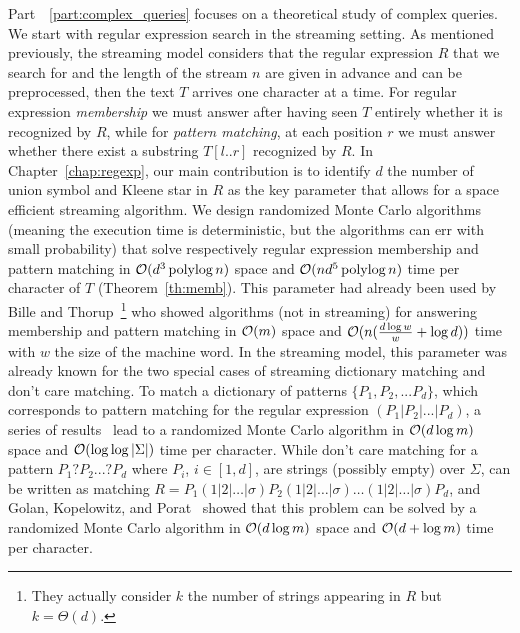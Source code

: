 Part~ \ref{part:complex_queries} focuses on a theoretical study of complex queries. 
%
We start with regular expression search in the streaming setting.
%
As mentioned previously, the streaming model considers that the regular expression $R$ that we search for and the length of the stream $n$ are given in advance and can be preprocessed, then the text $T$ arrives one character at a time. For regular expression \emph{membership} we must answer after having seen $T$ entirely whether it is recognized by $R$, while for \emph{pattern matching}, at each position $r$ we must answer whether there exist a substring $T[l..r]$ recognized by $R$.
In Chapter~\ref{chap:regexp}, our main contribution is to identify $d$ the number of union symbol and Kleene star in $R$ as the key parameter that allows for a space efficient streaming algorithm. We design randomized Monte Carlo algorithms (meaning the execution time is deterministic, but the algorithms can err with small probability) that solve respectively regular expression membership and pattern matching in $\mathcal{O}(d^3\operatorname{polylog} n)$ space and $\mathcal{O}(nd^5\operatorname{polylog} n)$ time per character of $T$ (Theorem~\ref{th:memb}).
This parameter had already been used by Bille and Thorup~\cite{doi:10.1137/1.9781611973075.104}\footnote{They actually consider $k$ the number of strings appearing in $R$ but $k=\Theta(d)$.} who showed algorithms (not in streaming) for answering membership and pattern matching in $\mathcal{O}(m)$ space and $\mathcal{O}(n(\frac{d\log w}{w} + \log d))$ time with $w$ the size of the machine word.
In the streaming model, this parameter was already known for the two special cases of streaming dictionary matching and don't care matching. To match a dictionary of patterns $\{P_1, P_2, ... P_d \}$, which corresponds to pattern matching for the regular expression $(P_1| P_2| ... | P_d)$, a series of results~\cite{Porat:09,DBLP:journals/talg/BreslauerG14,DBLP:conf/esa/CliffordFPSS15,DBLP:conf/esa/GolanP17,DBLP:conf/icalp/GolanKP18} lead to a randomized Monte Carlo algorithm in $\mathcal{O}(d\log m)$ space and $\mathcal{O}(\log \log |\Sigma|)$ time per character.
While don't care matching for a pattern $P_1 ? P_2 ... ? P_d$ where $P_i$, $i \in [1,d]$, are strings (possibly empty) over $\Sigma$, can be written as matching $R = P_1 (1|2|\ldots|\sigma) P_2 (1|2|\ldots|\sigma) \ldots (1|2|\ldots|\sigma) P_{d}$, and Golan, Kopelowitz, and Porat~\cite{DBLP:journals/algorithmica/GolanKP19} showed that this problem can be solved by a randomized Monte Carlo algorithm in $\mathcal{O}(d \log m)$ space and $\mathcal{O}(d+\log m)$ time per character.

